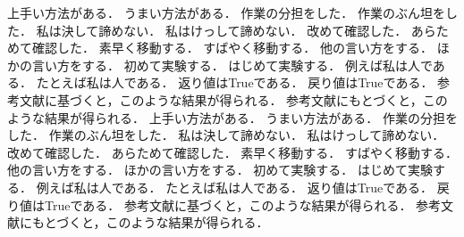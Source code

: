 上手い方法がある．
うまい方法がある．
作業の分担をした．
作業のぶん坦をした．
私は決して諦めない．
私はけっして諦めない．
改めて確認した．
あらためて確認した．
素早く移動する．
すばやく移動する．
他の言い方をする．
ほかの言い方をする．
初めて実験する．
はじめて実験する．
例えば私は人である．
たとえば私は人である．
返り値はTrueである．
戻り値はTrueである．
参考文献に基づくと，このような結果が得られる．
参考文献にもとづくと，このような結果が得られる．
上手い方法がある．
うまい方法がある．
作業の分担をした．
作業のぶん坦をした．
私は決して諦めない．
私はけっして諦めない．
改めて確認した．
あらためて確認した．
素早く移動する．
すばやく移動する．
他の言い方をする．
ほかの言い方をする．
初めて実験する．
はじめて実験する．
例えば私は人である．
たとえば私は人である．
返り値はTrueである．
戻り値はTrueである．
参考文献に基づくと，このような結果が得られる．
参考文献にもとづくと，このような結果が得られる．
